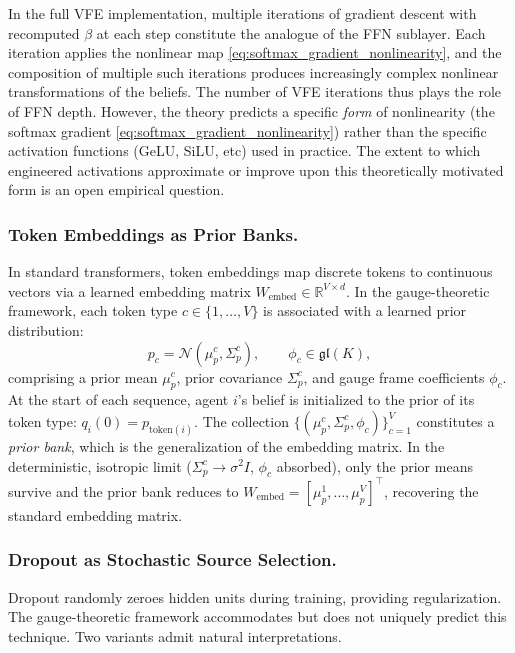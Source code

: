 \documentclass[twoside,11pt]{article}
\begin{document}
In the full VFE implementation, multiple iterations of gradient descent with recomputed $\beta$ at each step constitute the analogue of the FFN sublayer. Each iteration applies the nonlinear map \eqref{eq:softmax_gradient_nonlinearity}, and the composition of multiple such iterations produces increasingly complex nonlinear transformations of the beliefs. The number of VFE iterations thus plays the role of FFN depth. However, the theory predicts a specific \emph{form} of nonlinearity (the softmax gradient \eqref{eq:softmax_gradient_nonlinearity}) rather than the specific activation functions (GeLU, SiLU, etc) used in practice. The extent to which engineered activations approximate or improve upon this theoretically motivated form is an open empirical question.

\subsubsection{Token Embeddings as Prior Banks.}
\label{sec:embeddings}

In standard transformers, token embeddings map discrete tokens to continuous vectors via a learned embedding matrix $W_{\text{embed}} \in \mathbb{R}^{V \times d}$. In the gauge-theoretic framework, each token type $c \in \{1, \ldots, V\}$ is associated with a learned prior distribution:
\begin{equation}
p_c = \mathcal{N}(\mu_p^c, \Sigma_p^c), \qquad \phi_c \in \mathfrak{gl}(K),
\label{eq:prior_bank}
\end{equation}
comprising a prior mean $\mu_p^c$, prior covariance $\Sigma_p^c$, and gauge frame coefficients $\phi_c$. At the start of each sequence, agent $i$'s belief is initialized to the prior of its token type: $q_i(0) = p_{\mathrm{token}(i)}$. The collection $\{(\mu_p^c, \Sigma_p^c, \phi_c)\}_{c=1}^V$ constitutes a \emph{prior bank}, which is the generalization of the embedding matrix. In the deterministic, isotropic limit ($\Sigma_p^c \to \sigma^2 I$, $\phi_c$ absorbed), only the prior means survive and the prior bank reduces to $W_{\text{embed}} = [\mu_p^1, \ldots, \mu_p^V]^\top$, recovering the standard embedding matrix.

\subsubsection{Dropout as Stochastic Source Selection.}
\label{sec:dropout}

Dropout \citep{srivastava2014dropout} randomly zeroes hidden units during training, providing regularization. The gauge-theoretic framework accommodates but does not uniquely predict this technique. Two variants admit natural interpretations.
\end{document}
